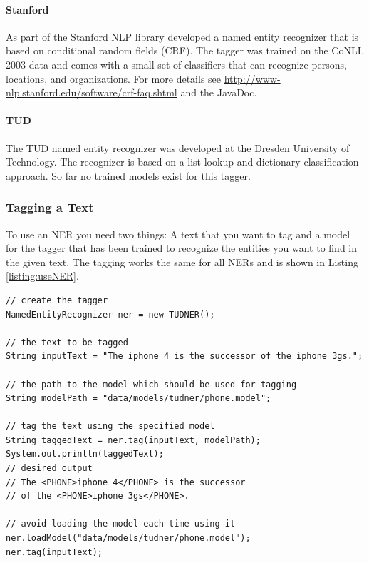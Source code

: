 \paragraph{Stanford} As part of the Stanford NLP library \cite{stanfordnlp, finkel2005stanfordner} developed a named entity recognizer that is based on conditional random fields (CRF). The tagger was trained on the CoNLL 2003 data and comes with a small set of classifiers that can recognize persons, locations, and organizations. For more details see \url{http://www-nlp.stanford.edu/software/crf-faq.shtml} and the JavaDoc.

\paragraph{TUD} The TUD named entity recognizer was developed at the Dresden University of Technology. The recognizer is based on a list lookup and dictionary classification approach. So far no trained models exist for this tagger.

\subsubsection{Tagging a Text}
To use an NER you need two things: A text that you want to tag and a model for the tagger that has been trained to recognize the entities you want to find in the given text.
The tagging works the same for all NERs and is shown in Listing \ref{listing:useNER}.

\begin{codelisting}
\begin{lstlisting}[label=listing:useNER,caption=Tagging a text using a named entity recognizer.,frame=tb]
// create the tagger
NamedEntityRecognizer ner = new TUDNER();

// the text to be tagged
String inputText = "The iphone 4 is the successor of the iphone 3gs.";

// the path to the model which should be used for tagging
String modelPath = "data/models/tudner/phone.model";

// tag the text using the specified model
String taggedText = ner.tag(inputText, modelPath);
System.out.println(taggedText);
// desired output
// The <PHONE>iphone 4</PHONE> is the successor
// of the <PHONE>iphone 3gs</PHONE>.

// avoid loading the model each time using it
ner.loadModel("data/models/tudner/phone.model");
ner.tag(inputText);
\end{lstlisting}
\end{codelisting}

